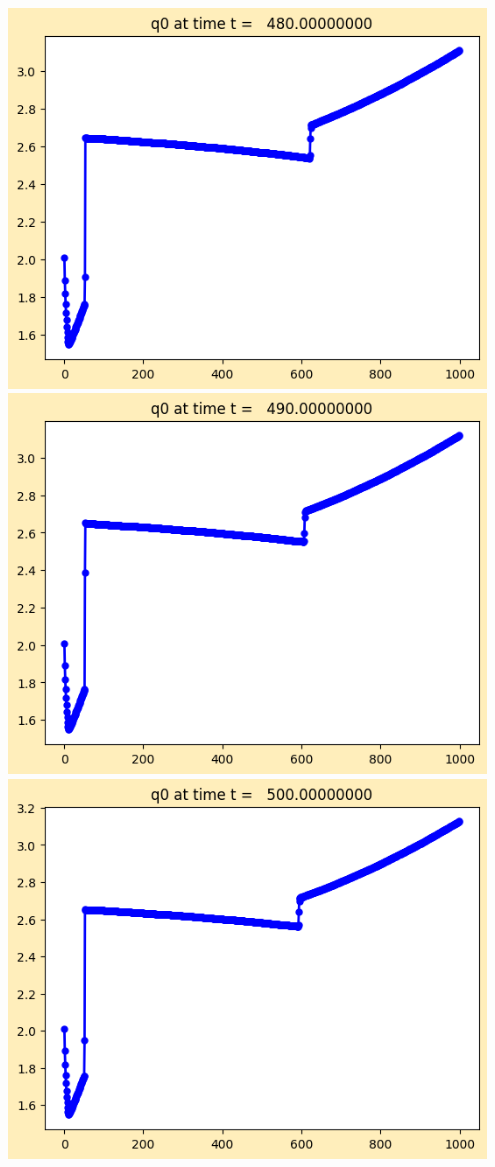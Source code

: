 \documentclass[11pt]{article}
\begin{document}
\vskip 10pt 
\includegraphics[width=0.95\textwidth]{frame0048fig1.png}
\vskip 10pt 
\includegraphics[width=0.95\textwidth]{frame0049fig1.png}
\vskip 10pt 
\includegraphics[width=0.95\textwidth]{frame0050fig1.png}
\end{document}
